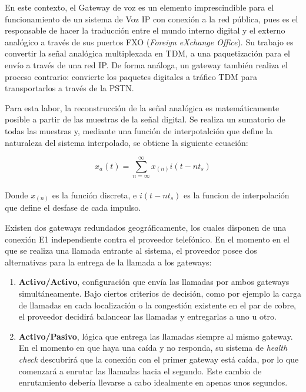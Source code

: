 \documentclass[a4paper, 12pt]{book}
\begin{document}
En este contexto, el Gateway de voz es un elemento imprescindible para el funcionamiento de un sistema de Voz IP con conexión a la red pública, pues es el responsable de hacer la traducción entre el mundo interno digital y el externo analógico a través de sus puertos FXO (\emph{Foreign eXchange Office}). Su trabajo es convertir la señal analógica multiplexada en TDM, a una paquetización para el envío a través de una red IP. De forma análoga, un gateway también realiza el proceso contrario: convierte los paquetes digitales a tráfico TDM para transportarlos a través de la PSTN.

Para esta labor, la reconstrucción de la señal analógica es matemáticamente posible a partir de las muestras de la señal digital. Se realiza un sumatorio de todas las muestras y, mediante una función de interpotalción que define la naturaleza del sistema interpolado, se obtiene la siguiente ecuación:

\large
\[
  x_{a}(t) = \sum_{n=\infty}^\infty x_{(n)}i(t-nt_{s})
\]
\\
\normalsize
Donde $x_{(n)}$ es la función discreta, e $i(t-nt_{s})$ es la funcion de interpolación que define el desfase de cada impulso.

Existen dos gateways redundados geográficamente, los cuales disponen de una conexión E1 independiente contra el proveedor telefónico. En el momento en el que se realiza una llamada entrante al sistema, el proveedor posee dos alternativas para la entrega de la llamada a los gateways:

\begin{enumerate}
  \item \textbf{Activo/Activo}, configuración que envía las llamadas por ambos gateways simultáneamente. Bajo ciertos criterios de decisión, como por ejemplo la carga de llamadas en cada localización o la congestión existente en el par de cobre, el proveedor decidirá balancear las llamadas y entregarlas a uno u otro.
  \item \textbf{Activo/Pasivo}, lógica que entrega las llamadas siempre al mismo gateway. En el momento en que haya una caída y no responda, su sistema de \emph{health check} descubrirá que la conexión con el primer gateway está caída, por lo que comenzará a enrutar las llamadas hacia el segundo. Este cambio de enrutamiento debería llevarse a cabo idealmente en apenas unos segundos.
\end{enumerate}
\end{document}
